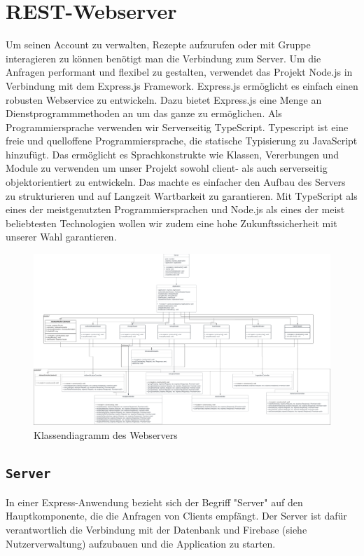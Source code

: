 \documentclass{entwurfsheft}
\begin{document}
\section{REST-Webserver}
Um seinen Account zu verwalten, Rezepte aufzurufen oder mit Gruppe interagieren zu können benötigt man die Verbindung zum Server.
Um die Anfragen performant und flexibel zu gestalten, verwendet das Projekt Node.js in Verbindung mit dem Express.js Framework.
Express.js ermöglicht es einfach einen robusten Webservice zu entwickeln. Dazu bietet Express.js eine Menge an Dienstprogrammmethoden an um das ganze zu ermöglichen.
Als Programmiersprache verwenden wir Serverseitig TypeScript. Typescript ist eine freie und quelloffene Programmiersprache, die statische Typisierung zu JavaScript hinzufügt.
Das ermöglicht es Sprachkonstrukte wie Klassen, Vererbungen und Module zu verwenden um unser Projekt sowohl client- als auch serverseitig objektorientiert zu entwickeln.
Das machte es einfacher den Aufbau des Servers zu strukturieren und auf Langzeit Wartbarkeit zu garantieren. Mit TypeScript als eines der meistgenutzten Programmiersprachen und Node.js als eines der meist beliebtesten Technologien wollen wir zudem eine hohe Zukunftssicherheit mit unserer Wahl garantieren.

\begin{figure}[htp]
    \centering
    \includegraphics[width = 1\textwidth]{images/webserver/webserver.pdf}
    \caption{Klassendiagramm des Webservers}
    \label{fig:webserver}
\end{figure}

\newpage

\subsection{\texttt{Server}}\label{sec:Server}
In einer Express-Anwendung bezieht sich der Begriff "Server" auf den Hauptkomponente, die die Anfragen von Clients empfängt.
Der Server ist dafür verantwortlich die Verbindung mit der Datenbank und Firebase (siehe Nutzerverwaltung) aufzubauen und die Application zu starten.
\end{document}
